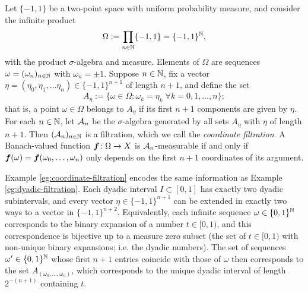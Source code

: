 \begin{example}\label{eg:coordinate-filtration}
  Let $\{-1,1\}$ be a two-point space with uniform probability measure, and consider the infinite product
  \begin{equation*}
    \Omega := \prod_{n \in \mathbb{N}} \{-1,1\} = \{-1,1\}^{\mathbb{N}},
  \end{equation*}
  with the product $\sigma$-algebra and measure.
  Elements of $\Omega$ are sequences $\omega = (\omega_n)_{n \in \mathbb{N}}$ with $\omega_n = \pm 1$.
  Suppose $n \in \mathbb{N}$, fix a vector $\eta = (\eta_0, \eta_1, \ldots \eta_n) \in \{-1,1\}^{n+1}$ of length $n+1$, and define the set
  \begin{equation*}
    A_{\eta} := \{\omega \in \Omega : \omega_k = \eta_k \; \forall k = 0,1,\ldots,n\};
  \end{equation*}
  that is, a point $\omega \in \Omega$ belongs to $A_{\eta}$ if its first $n+1$ components are given by $\eta$.
  For each $n \in \mathbb{N}$, let $\mathcal{A}_n$ be the $\sigma$-algebra generated by all sets $A_{\eta}$ with $\eta$ of length $n+1$.
  Then $(\mathcal{A}_n)_{n \in \mathbb{N}}$ is a filtration, which we call the \emph{coordinate filtration}.
  A Banach-valued function $\bm{f} \colon \Omega \rightarrow X$ is $\mathcal{A}_n$-measurable if and only if $\bm{f}(\omega) = \bm{f}(\omega_0,\ldots,\omega_n)$ only depends on the first $n+1$ coordinates of its argument.
\end{example}

\begin{rmk}
  Example \ref{eg:coordinate-filtration} encodes the same information as Example \ref{eg:dyadic-filtration}.
  Each dyadic interval $I \subset [0,1]$ has exactly two dyadic subintervals, and every vector $\eta \in \{-1,1\}^{n+1}$ can be extended in exactly two ways to a vector in $\{-1,1\}^{n+2}$.
  Equivalently, each infinite sequence $\omega \in \{0,1\}^{\mathbb{N}}$ corresponds to the binary expansion of a number $t \in [0,1)$, and this correspondence is bijective up to a measure zero subset (the set of $t \in [0,1)$ with non-unique binary expansions; i.e. the dyadic numbers).
  The set of sequences $\omega' \in \{0,1\}^{\mathbb{N}}$ whose first $n+1$ entries coincide with those of $\omega$ then corresponds to the set $A_{(\omega_0,\ldots,\omega_n)}$, which corresponds to the unique dyadic interval of length $2^{-(n+1)}$ containing $t$. 
\end{rmk}

